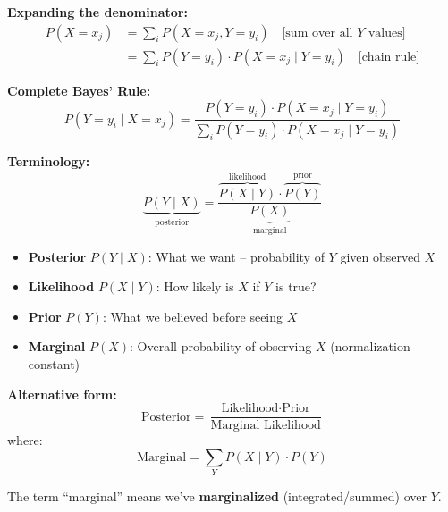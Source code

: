 \textbf{Expanding the denominator:}
\begin{align*}
P(X = x_j) &= \sum_{i} P(X = x_j, Y = y_i) \quad \text{[sum over all $Y$ values]} \\
           &= \sum_{i} P(Y = y_i) \cdot P(X = x_j \mid Y = y_i) \quad \text{[chain rule]}
\end{align*}

\textbf{Complete Bayes' Rule:}
\[
P(Y = y_i \mid X = x_j) = \frac{P(Y = y_i) \cdot P(X = x_j \mid Y = y_i)}{\sum_{i} P(Y = y_i) \cdot P(X = x_j \mid Y = y_i)}
\]

\textbf{Terminology:}
\[
\underbrace{P(Y \mid X)}_{\text{posterior}} = \frac{\overbrace{P(X \mid Y)}^{\text{likelihood}} \cdot \overbrace{P(Y)}^{\text{prior}}}{\underbrace{P(X)}_{\text{marginal}}}
\]

\begin{itemize}
    \item \textbf{Posterior} $P(Y \mid X)$: What we want -- probability of $Y$ given observed $X$
    \item \textbf{Likelihood} $P(X \mid Y)$: How likely is $X$ if $Y$ is true?
    \item \textbf{Prior} $P(Y)$: What we believed before seeing $X$
    \item \textbf{Marginal} $P(X)$: Overall probability of observing $X$ (normalization constant)
\end{itemize}

\textbf{Alternative form:}
\[
\text{Posterior} = \frac{\text{Likelihood} \cdot \text{Prior}}{\text{Marginal Likelihood}}
\]
where:
\[
\text{Marginal} = \sum_{Y} P(X \mid Y) \cdot P(Y)
\]

The term ``marginal'' means we've \textbf{marginalized} (integrated/summed) over $Y$.
